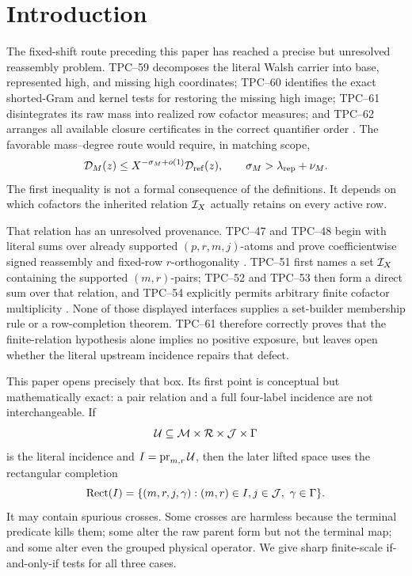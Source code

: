 \section{Introduction}
\label{sec:introduction}

The fixed-shift route preceding this paper has reached a precise but
unresolved reassembly problem.  TPC--59 decomposes the literal Walsh
carrier into base, represented high, and missing high coordinates;
TPC--60 identifies the exact shorted-Gram and kernel tests for restoring
the missing high image; TPC--61 disintegrates its raw mass into realized
row cofactor measures; and TPC--62 arranges all available closure
certificates in the correct quantifier order
\citep{WangTPC59,WangTPC60,WangTPC61,WangTPC62}.  The favorable
mass--degree route would require, in matching scope,
\begin{equation}
 \mathcal D_M(z)\le X^{-\sigma_M+o(1)}\mathcal D_{\rm ref}(z),
 \qquad
 \sigma_M>\lambda_{\rm rep}+\nu_M.
 \label{eq:intro-mass-degree-target}
\end{equation}
The first inequality is not a formal consequence of the definitions.  It
depends on which cofactors the inherited relation \(\mathcal I_X\) actually
retains on every active row.

That relation has an unresolved provenance.  TPC--47 and TPC--48 begin
with literal sums over already supported \((p,r,m,j)\)-atoms and prove
coefficientwise signed reassembly and fixed-row \(r\)-orthogonality
\citep{WangTPC47,WangTPC48}.  TPC--51 first names a set
\(\mathcal I_X\) containing the supported \((m,r)\)-pairs; TPC--52 and
TPC--53 then form a direct sum over that relation, and TPC--54 explicitly
permits arbitrary finite cofactor multiplicity
\citep{WangTPC51,WangTPC52,WangTPC53,WangTPC54}.  None of those displayed
interfaces supplies a set-builder membership rule or a row-completion
theorem.  TPC--61 therefore correctly proves that the finite-relation
hypothesis alone implies no positive exposure, but leaves open whether the
literal upstream incidence repairs that defect.

This paper opens precisely that box.  Its first point is conceptual but
mathematically exact: a pair relation and a full four-label incidence are
not interchangeable.  If
\[
 \mathcal U\subseteq\mathcal M\times\mathcal R\times\mathcal J\times\Gamma
\]
is the literal incidence and \(I=\operatorname{pr}_{m,r}\mathcal U\), then the later lifted
space uses the rectangular completion
\[
 \operatorname{Rect}(I)=\{(m,r,j,\gamma):(m,r)\in I,
                 j\in\mathcal J,\ \gamma\in\Gamma\}.
\]
It may contain spurious crosses.  Some crosses are harmless because the
terminal predicate kills them; some alter the raw parent form but not the
terminal map; and some alter even the grouped physical operator.  We give
sharp finite-scale if-and-only-if tests for all three cases.

